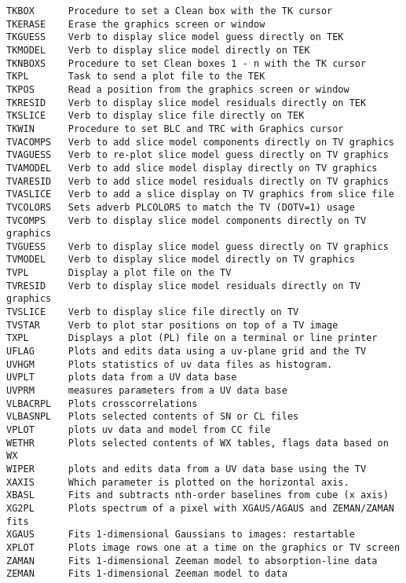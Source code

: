 \begin{verbatim}
TKBOX      Procedure to set a Clean box with the TK cursor
TKERASE    Erase the graphics screen or window
TKGUESS    Verb to display slice model guess directly on TEK
TKMODEL    Verb to display slice model directly on TEK
TKNBOXS    Procedure to set Clean boxes 1 - n with the TK cursor
TKPL       Task to send a plot file to the TEK
TKPOS      Read a position from the graphics screen or window
TKRESID    Verb to display slice model residuals directly on TEK
TKSLICE    Verb to display slice file directly on TEK
TKWIN      Procedure to set BLC and TRC with Graphics cursor
TVACOMPS   Verb to add slice model components directly on TV graphics
TVAGUESS   Verb to re-plot slice model guess directly on TV graphics
TVAMODEL   Verb to add slice model display directly on TV graphics
TVARESID   Verb to add slice model residuals directly on TV graphics
TVASLICE   Verb to add a slice display on TV graphics from slice file
TVCOLORS   Sets adverb PLCOLORS to match the TV (DOTV=1) usage
TVCOMPS    Verb to display slice model components directly on TV graphics
TVGUESS    Verb to display slice model guess directly on TV graphics
TVMODEL    Verb to display slice model directly on TV graphics
TVPL       Display a plot file on the TV
TVRESID    Verb to display slice model residuals directly on TV graphics
TVSLICE    Verb to display slice file directly on TV
TVSTAR     Verb to plot star positions on top of a TV image
TXPL       Displays a plot (PL) file on a terminal or line printer
UFLAG      Plots and edits data using a uv-plane grid and the TV
UVHGM      Plots statistics of uv data files as histogram.
UVPLT      plots data from a UV data base
UVPRM      measures parameters from a UV data base
VLBACRPL   Plots crosscorrelations
VLBASNPL   Plots selected contents of SN or CL files
VPLOT      plots uv data and model from CC file
WETHR      Plots selected contents of WX tables, flags data based on WX
WIPER      plots and edits data from a UV data base using the TV
XAXIS      Which parameter is plotted on the horizontal axis.
XBASL      Fits and subtracts nth-order baselines from cube (x axis)
XG2PL      Plots spectrum of a pixel with XGAUS/AGAUS and ZEMAN/ZAMAN fits
XGAUS      Fits 1-dimensional Gaussians to images: restartable
XPLOT      Plots image rows one at a time on the graphics or TV screen
ZAMAN      Fits 1-dimensional Zeeman model to absorption-line data
ZEMAN      Fits 1-dimensional Zeeman model to data
\end{verbatim}\eve

\vfill\eject
{}

